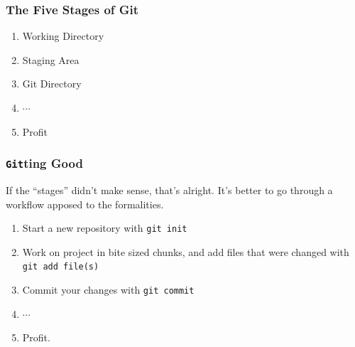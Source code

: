 \documentclass{beamer}
\newcounter{committing}
\newcommand{\shellcmd}[1]{\texttt{\colorbox{gray!30}{#1}}}
\begin{document}
\begin{frame}
    \frametitle{The Five Stages of Git}

    \begin{enumerate}
        \item Working Directory %
        \item Staging Area %
        \item Git Directory %
        \item $\cdots$
        \item Profit %
    \end{enumerate}
\end{frame}

\begin{frame}
    \frametitle{\shellcmd{Git}ting Good}

    If the ``stages'' didn't make sense, that's alright. It's better to go through a workflow apposed to the formalities.

    \begin{enumerate}
        \item Start a new repository with \shellcmd{git init} %
        \item Work on project in bite sized chunks, and add files that were changed with \shellcmd{git add file(s)} %
        \item Commit your changes with \shellcmd{git commit} %
        \item $\cdots$
        \item Profit.
    \end{enumerate}
\end{frame}
\end{document}
